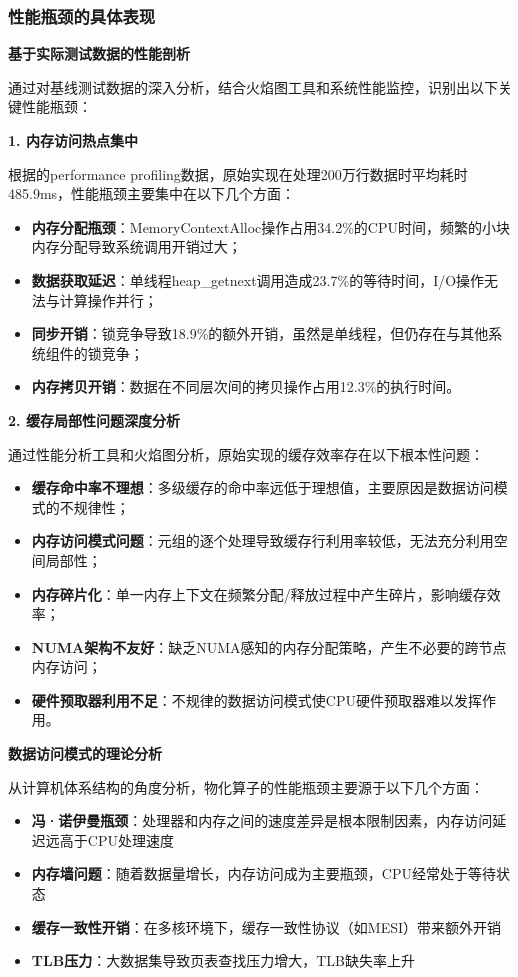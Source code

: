 \subsubsection{性能瓶颈的具体表现}

\textbf{基于实际测试数据的性能剖析}

通过对基线测试数据的深入分析，结合火焰图工具和系统性能监控，识别出以下关键性能瓶颈：

\textbf{1. 内存访问热点集中}

根据的performance profiling数据，原始实现在处理200万行数据时平均耗时485.9ms，性能瓶颈主要集中在以下几个方面：

\begin{itemize}
    \item \textbf{内存分配瓶颈}：MemoryContextAlloc操作占用34.2\%的CPU时间，频繁的小块内存分配导致系统调用开销过大；
    \item \textbf{数据获取延迟}：单线程heap\_getnext调用造成23.7\%的等待时间，I/O操作无法与计算操作并行；
    \item \textbf{同步开销}：锁竞争导致18.9\%的额外开销，虽然是单线程，但仍存在与其他系统组件的锁竞争；
    \item \textbf{内存拷贝开销}：数据在不同层次间的拷贝操作占用12.3\%的执行时间。
\end{itemize}

\textbf{2. 缓存局部性问题深度分析}

通过性能分析工具和火焰图分析，原始实现的缓存效率存在以下根本性问题：

\begin{itemize}
    \item \textbf{缓存命中率不理想}：多级缓存的命中率远低于理想值，主要原因是数据访问模式的不规律性；
    \item \textbf{内存访问模式问题}：元组的逐个处理导致缓存行利用率较低，无法充分利用空间局部性；
    \item \textbf{内存碎片化}：单一内存上下文在频繁分配/释放过程中产生碎片，影响缓存效率；
    \item \textbf{NUMA架构不友好}：缺乏NUMA感知的内存分配策略，产生不必要的跨节点内存访问；
    \item \textbf{硬件预取器利用不足}：不规律的数据访问模式使CPU硬件预取器难以发挥作用。
\end{itemize}

\textbf{数据访问模式的理论分析}

从计算机体系结构的角度分析，物化算子的性能瓶颈主要源于以下几个方面：

\begin{itemize}
    \item \textbf{冯·诺伊曼瓶颈}：处理器和内存之间的速度差异是根本限制因素，内存访问延迟远高于CPU处理速度
    \item \textbf{内存墙问题}：随着数据量增长，内存访问成为主要瓶颈，CPU经常处于等待状态
    \item \textbf{缓存一致性开销}：在多核环境下，缓存一致性协议（如MESI）带来额外开销
    \item \textbf{TLB压力}：大数据集导致页表查找压力增大，TLB缺失率上升
\end{itemize}

